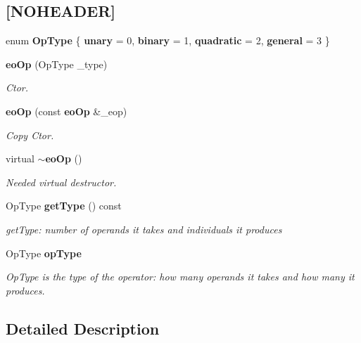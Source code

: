 \subsection*{[NOHEADER]}
\begin{CompactItemize}
\item 
enum {\bf Op\-Type} \{ {\bf unary} =  0, 
{\bf binary} =  1, 
{\bf quadratic} =  2, 
{\bf general} =  3
 \}
\item 
{\bf eo\-Op} (Op\-Type \_\-type)\label{classeo_op_z14_1}

\begin{CompactList}\small\item\em Ctor. \item\end{CompactList}\item 
{\bf eo\-Op} (const {\bf eo\-Op} \&\_\-eop)\label{classeo_op_z14_2}

\begin{CompactList}\small\item\em Copy Ctor. \item\end{CompactList}\item 
virtual {\bf $\sim$eo\-Op} ()\label{classeo_op_z14_3}

\begin{CompactList}\small\item\em Needed virtual destructor. \item\end{CompactList}\item 
Op\-Type {\bf get\-Type} () const \label{classeo_op_z14_4}

\begin{CompactList}\small\item\em get\-Type: number of operands it takes and individuals it produces \item\end{CompactList}\item 
Op\-Type {\bf op\-Type}\label{classeo_op_z14_5}

\begin{CompactList}\small\item\em Op\-Type is the type of the operator: how many operands it takes and how many it produces. \item\end{CompactList}\end{CompactItemize}


\subsection{Detailed Description}
